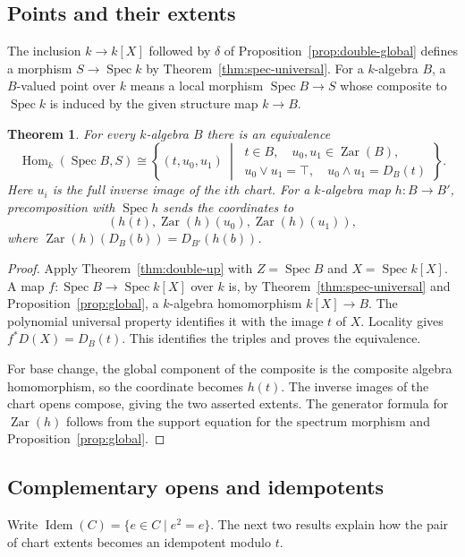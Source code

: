 \documentclass[11pt]{amsart}
\newtheorem{theorem}{Theorem}[section]
\theoremstyle{definition}
\theoremstyle{remark}
\newcommand{\Zar}{\operatorname{Zar}}
\newcommand{\Spec}{\operatorname{Spec}}
\newcommand{\Hom}{\operatorname{Hom}}
\newcommand{\Idem}{\operatorname{Idem}}
\begin{document}
\subsection{Points and their extents}

The inclusion $k\to k[X]$ followed by $\delta$ of
Proposition~\ref{prop:double-global} defines a morphism $S\to\Spec k$
by Theorem~\ref{thm:spec-universal}. For a $k$-algebra $B$, a
$B$-valued point over $k$ means a local morphism $\Spec B\to S$ whose
composite to $\Spec k$ is induced by the given structure map $k\to B$.

\begin{theorem}\label{thm:double-points}
For every $k$-algebra $B$ there is an equivalence
\[
 \Hom_k(\Spec B,S)\cong
 \left\{(t,u_0,u_1)\ \middle|\
 \begin{array}{l}
 t\in B,\quad u_0,u_1\in\Zar(B),\\
 u_0\vee u_1=\top,\quad u_0\wedge u_1=D_B(t)
 \end{array}\right\}.
\]
Here $u_i$ is the full inverse image of the $i$th chart. For a
$k$-algebra map $h:B\to B'$, precomposition with $\Spec h$ sends the
coordinates to
\[
 (h(t),\Zar(h)(u_0),\Zar(h)(u_1)),
\]
where $\Zar(h)(D_B(b))=D_{B'}(h(b))$.
\end{theorem}
\begin{proof}
Apply Theorem~\ref{thm:double-up} with $Z=\Spec B$ and
$X=\Spec k[X]$. A map $f:\Spec B\to\Spec k[X]$ over $k$ is, by
Theorem~\ref{thm:spec-universal} and Proposition~\ref{prop:global}, a
$k$-algebra homomorphism $k[X]\to B$. The polynomial universal property
identifies it with the image $t$ of $X$. Locality gives
$f^*D(X)=D_B(t)$. This identifies the triples and proves the equivalence.

For base change, the global component of the composite is the composite
algebra homomorphism, so the coordinate becomes $h(t)$. The inverse
images of the chart opens compose, giving the two asserted extents.
The generator formula for $\Zar(h)$ follows from the support equation
for the spectrum morphism and Proposition~\ref{prop:global}.
\end{proof}

\subsection{Complementary opens and idempotents}

Write $\Idem(C)=\{e\in C\mid e^2=e\}$. The next two results explain
how the pair of chart extents becomes an idempotent modulo $t$.
\end{document}
